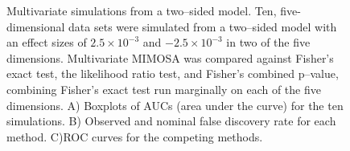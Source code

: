 \documentclass[11pt]{article}
\begin{document}
\begin{figure}[htbp] %
   \centering
{}
   \caption{Multivariate simulations from a two--sided model. Ten, five-dimensional data sets were simulated from a two--sided model with an effect sizes of $2.5\times 10^{-3}$ and $-2.5\times 10^{-3}$ in two of the five dimensions. Multivariate MIMOSA was compared against Fisher's exact test, the likelihood ratio test, and Fisher's combined p--value, combining Fisher's exact test run marginally on each of the five dimensions. A) Boxplots of AUCs (area under the curve) for the ten simulations. B) Observed and nominal false discovery rate for each method. C)ROC curves for the competing methods.}
   \label{fig:mvsimulations}
\end{figure}
\clearpage
%
\end{document}
